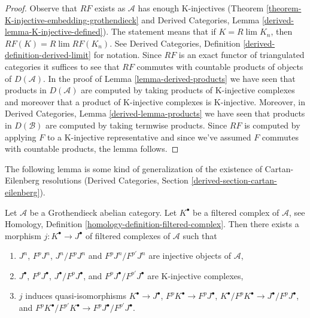 \begin{proof}
Observe that $RF$ exists as $\mathcal{A}$ has enough K-injectives
(Theorem \ref{theorem-K-injective-embedding-grothendieck}
and
Derived Categories, Lemma \ref{derived-lemma-K-injective-defined}).
The statement means that if $K = R\lim K_n$, then
$RF(K) = R\lim RF(K_n)$. See
Derived Categories, Definition \ref{derived-definition-derived-limit}
for notation. Since $RF$ is an exact functor of triangulated
categories it suffices to see that $RF$ commutes with countable
products of objects of $D(\mathcal{A})$. In the proof of
Lemma \ref{lemma-derived-products}
we have seen that products in $D(\mathcal{A})$ are computed by
taking products of K-injective complexes and moreover that a
product of K-injective complexes is K-injective.
Moreover, in Derived Categories, Lemma
\ref{derived-lemma-products}
we have seen that products in $D(\mathcal{B})$ are computed
by taking termwise products.
Since $RF$ is computed by applying $F$ to a K-injective
representative and since we've assumed $F$ commutes with
countable products, the lemma follows.
\end{proof}

\noindent
The following lemma is some kind of generalization of
the existence of Cartan-Eilenberg resolutions
(Derived Categories, Section \ref{derived-section-cartan-eilenberg}).

\begin{lemma}
\label{lemma-K-injective-embedding-filtration}
Let $\mathcal{A}$ be a Grothendieck abelian category.
Let $K^\bullet$ be a filtered complex of $\mathcal{A}$, see
Homology, Definition \ref{homology-definition-filtered-complex}.
Then there exists a morphism $j : K^\bullet \to J^\bullet$
of filtered complexes of $\mathcal{A}$ such that
\begin{enumerate}
\item $J^n$, $F^pJ^n$, $J^n/F^pJ^n$ and $F^pJ^n/F^{p'}J^n$ are injective
objects of $\mathcal{A}$,
\item $J^\bullet$, $F^pJ^\bullet$, $J^\bullet/F^pJ^\bullet$, and
$F^pJ^\bullet/F^{p'}J^\bullet$ are K-injective complexes,
\item $j$ induces quasi-isomorphisms
$K^\bullet \to J^\bullet$,
$F^pK^\bullet \to F^pJ^\bullet$,
$K^\bullet/F^pK^\bullet \to J^\bullet/F^pJ^\bullet$, and
$F^pK^\bullet/F^{p'}K^\bullet \to F^pJ^\bullet/F^{p'}J^\bullet$.
\end{enumerate}
\end{lemma}

